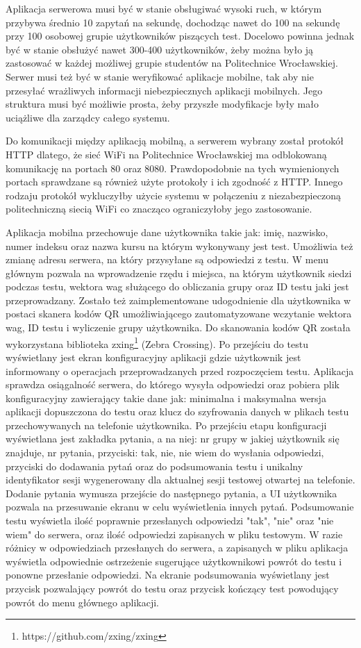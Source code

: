 \documentclass{report}
\begin{document}
	Aplikacja serwerowa musi być w stanie obsługiwać wysoki ruch, w którym przybywa średnio 10 zapytań na sekundę, dochodząc nawet do 100 na sekundę przy 100 osobowej grupie użytkowników piszących test. Docelowo powinna jednak być w stanie obsłużyć nawet 300-400 użytkowników, żeby można było ją zastosować w każdej możliwej grupie studentów na Politechnice Wrocławskiej. Serwer musi też być w stanie weryfikować aplikacje mobilne, tak aby nie przesyłać wrażliwych informacji niebezpiecznych aplikacji mobilnych. Jego struktura musi być możliwie prosta, żeby przyszłe modyfikacje były mało uciążliwe dla zarządcy całego systemu.
	
	Do komunikacji między aplikacją mobilną, a serwerem wybrany został protokół HTTP dlatego, że sieć WiFi na Politechnice Wrocławskiej ma odblokowaną komunikację na portach 80 oraz 8080. Prawdopodobnie na tych wymienionych portach sprawdzane są również użyte protokoły i ich zgodność z HTTP. Innego rodzaju protokół wykluczyłby użycie systemu w połączeniu z niezabezpieczoną politechniczną siecią WiFi co znacząco ograniczyłoby jego zastosowanie.
	
	Aplikacja mobilna przechowuje dane użytkownika takie jak: imię, nazwisko, numer indeksu oraz nazwa kursu na którym wykonywany jest test. Umożliwia też zmianę adresu serwera, na który przysyłane są odpowiedzi z testu. W menu głównym pozwala na wprowadzenie rzędu i miejsca, na którym użytkownik siedzi podczas testu, wektora wag służącego do obliczania grupy oraz ID testu jaki jest przeprowadzany. Zostało też zaimplementowane udogodnienie dla użytkownika w postaci skanera kodów QR umożliwiającego zautomatyzowane wczytanie wektora wag, ID testu i wyliczenie grupy użytkownika. Do skanowania kodów QR została wykorzystana biblioteka zxing\footnote{https://github.com/zxing/zxing} (Zebra Crossing). Po przejściu do testu wyświetlany jest ekran konfiguracyjny aplikacji gdzie użytkownik jest informowany o operacjach przeprowadzanych przed rozpoczęciem testu. Aplikacja sprawdza osiągalność serwera, do którego wysyła odpowiedzi oraz pobiera plik konfiguracyjny zawierający takie dane jak: minimalna i maksymalna wersja aplikacji dopuszczona do testu oraz klucz do szyfrowania danych w plikach testu przechowywanych na telefonie użytkownika. Po przejściu etapu konfiguracji wyświetlana jest zakładka pytania, a na niej: nr grupy w jakiej użytkownik się znajduje, nr pytania, przyciski: tak, nie, nie wiem do wysłania odpowiedzi, przyciski do dodawania pytań oraz do podsumowania testu i unikalny identyfikator sesji wygenerowany dla aktualnej sesji testowej otwartej na telefonie. Dodanie pytania wymusza przejście do następnego pytania, a UI użytkownika pozwala na przesuwanie ekranu w celu wyświetlenia innych pytań. Podsumowanie testu wyświetla ilość poprawnie przesłanych odpowiedzi "tak", "nie" oraz "nie wiem" do serwera, oraz ilość odpowiedzi zapisanych w pliku testowym. W razie różnicy w odpowiedziach przesłanych do serwera, a zapisanych w pliku aplikacja wyświetla odpowiednie ostrzeżenie sugerujące użytkownikowi powrót do testu i ponowne przesłanie odpowiedzi. Na ekranie podsumowania wyświetlany jest przycisk pozwalający powrót do testu oraz przycisk kończący test powodujący powrót do menu głównego aplikacji.
	
\end{document}
